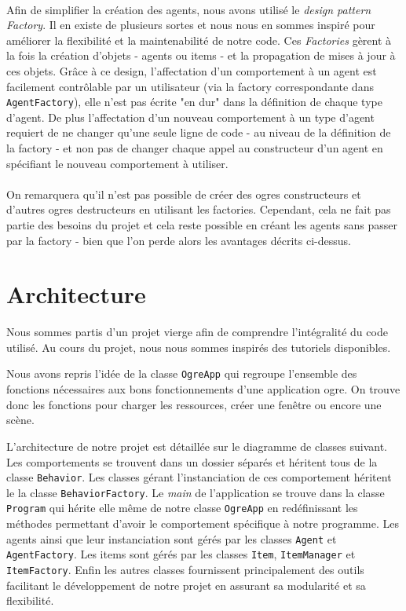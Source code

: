 \paragraph{}
Afin de simplifier la création des agents, nous avons utilisé le \emph{design
pattern Factory}. Il en existe de plusieurs sortes et nous nous en sommes
inspiré pour améliorer la flexibilité et la maintenabilité de notre
code. Ces \emph{Factories} gèrent à la fois la création d'objets - agents ou
items - et la propagation de mises à jour à ces objets. Grâce à ce design,
l'affectation d'un comportement à un agent est facilement contrôlable par un
utilisateur (via la factory correspondante dans \verb!AgentFactory!), elle
n'est pas écrite "en dur" dans la définition de chaque type d'agent. De plus
l'affectation d'un nouveau comportement à un type d'agent requiert de ne
changer qu'une seule ligne de code - au niveau de la définition de la factory
- et non pas de changer chaque appel au constructeur d'un agent en spécifiant
le nouveau comportement à utiliser.

\paragraph{}
On remarquera qu'il n'est pas possible de créer des ogres constructeurs et
d'autres ogres destructeurs en utilisant les factories. Cependant, cela ne
fait pas partie des besoins du projet et cela reste possible en créant les
agents sans passer par la factory - bien que l'on perde alors les avantages
décrits ci-dessus.

\section{Architecture}
Nous sommes partis d'un projet vierge afin de comprendre l'intégralité du code
utilisé. Au cours du projet, nous nous sommes inspirés des tutoriels
disponibles.

Nous avons repris l'idée de la classe \texttt{OgreApp} qui regroupe l'ensemble
des fonctions nécessaires aux bons fonctionnements d'une application ogre. On
trouve donc les fonctions pour charger les ressources, créer une fenêtre ou
encore une scène.

L'architecture de notre projet est détaillée sur le diagramme de classes
suivant. Les comportements se trouvent dans un dossier séparés et héritent
tous de la classe \verb!Behavior!. Les classes gérant l'instanciation de ces
comportement héritent le la classe \verb!BehaviorFactory!. Le \emph{main} de
l'application se trouve dans la classe \verb!Program! qui hérite elle même de
notre classe \verb!OgreApp! en redéfinissant les méthodes permettant d'avoir
le comportement spécifique à notre programme. Les agents ainsi que leur
instanciation sont gérés par les classes \verb!Agent! et \verb!AgentFactory!. Les
items sont gérés par les classes \verb!Item!, \verb!ItemManager! et
\verb!ItemFactory!. Enfin les autres classes fournissent principalement des
outils facilitant le développement de notre projet en assurant sa modularité
et sa flexibilité.

